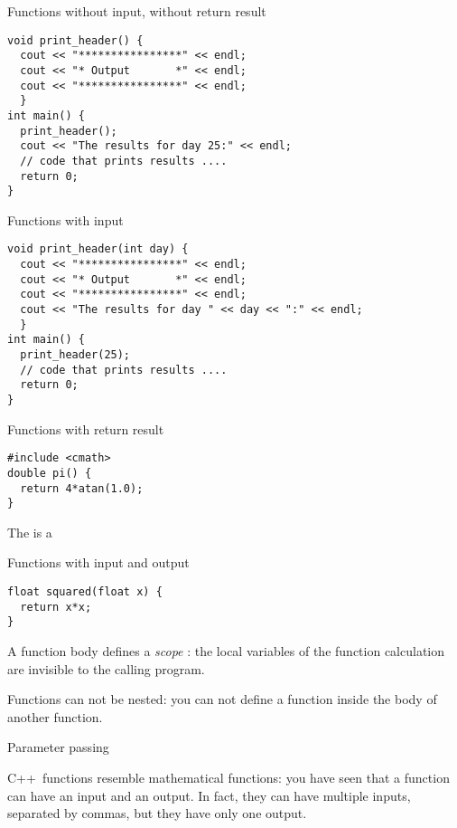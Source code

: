 \begin{block}{Functions without input, without return result}
  \label{sl:func-ex1}
\begin{verbatim}
void print_header() {
  cout << "****************" << endl;
  cout << "* Output       *" << endl;
  cout << "****************" << endl;
  }
int main() {
  print_header();
  cout << "The results for day 25:" << endl;
  // code that prints results ....
  return 0;
}
\end{verbatim}
\end{block}

\begin{block}{Functions with input}
  \label{sl:func-ex2}
\begin{verbatim}
void print_header(int day) {
  cout << "****************" << endl;
  cout << "* Output       *" << endl;
  cout << "****************" << endl;
  cout << "The results for day " << day << ":" << endl;
  }
int main() {
  print_header(25);
  // code that prints results ....
  return 0;
}
\end{verbatim}
\end{block}

\begin{block}{Functions with return result}
  \label{sl:func-return}
\begin{verbatim}
#include <cmath>
double pi() {
  return 4*atan(1.0);
}
\end{verbatim}
The  is a 
\end{block}

\begin{block}{Functions with input and output}
  \label{sl:func-param-return}
\begin{verbatim}
float squared(float x) {
  return x*x;
}
\end{verbatim}
\end{block}

A function body defines a
%
\emph{scope}%
:
the local variables of the function calculation are invisible to the
calling program.

Functions can not be nested: you can not define a function inside the
body of another function.

 {Parameter passing}
\label{sec:passing}

C++~functions resemble mathematical functions: you have seen that a
function can have an input and an output. In fact, they can have
multiple inputs, separated by commas, but they have only one output.

